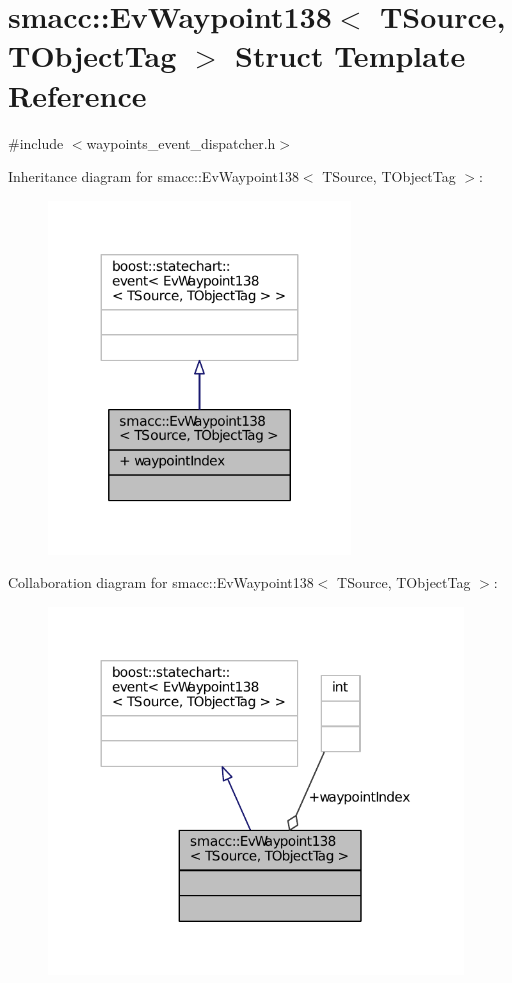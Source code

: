 \hypertarget{structsmacc_1_1EvWaypoint138}{}\section{smacc\+:\+:Ev\+Waypoint138$<$ T\+Source, T\+Object\+Tag $>$ Struct Template Reference}
\label{structsmacc_1_1EvWaypoint138}


{\ttfamily \#include $<$waypoints\+\_\+event\+\_\+dispatcher.\+h$>$}



Inheritance diagram for smacc\+:\+:Ev\+Waypoint138$<$ T\+Source, T\+Object\+Tag $>$\+:
\nopagebreak
\begin{figure}[H]
\begin{center}
\leavevmode
\includegraphics[width=227pt]{structsmacc_1_1EvWaypoint138__inherit__graph}
\end{center}
\end{figure}


Collaboration diagram for smacc\+:\+:Ev\+Waypoint138$<$ T\+Source, T\+Object\+Tag $>$\+:
\nopagebreak
\begin{figure}[H]
\begin{center}
\leavevmode
\includegraphics[width=312pt]{structsmacc_1_1EvWaypoint138__coll__graph}
\end{center}
\end{figure}
